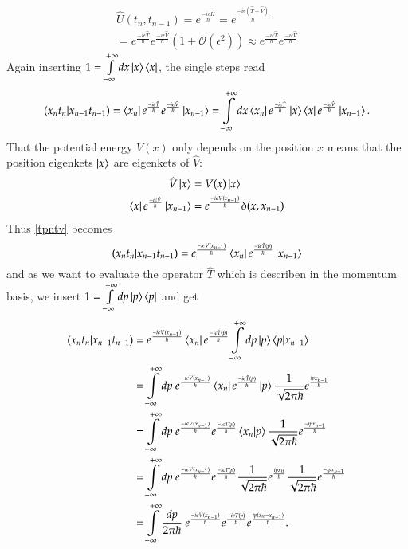 \begin{align}\label{UTV}
  \hat{U}(t_{n},t_{n-1}) = e^{\frac{-i \epsilon \hat{H}}{\hbar}} = e^{\frac{-i \epsilon (\hat T + \hat V)}{\hbar}} \\
  = e^{\frac{-i \epsilon \hat{T}}{\hbar}} e^{\frac{-i \epsilon \hat{V}}{\hbar}} (1 + \mathcal{O} (\epsilon^2) ) \approx e^{\frac{-i \epsilon \hat{T}}{\hbar}} e^{\frac{-i \epsilon \hat{V}}{\hbar}} 
\end{align}
Again inserting $1 = \int\limits_{-\infty}^{+\infty} dx \ket{x}\bra{x}$, the single steps read
\begin{equation}\label{tpntv}
  (x_n t_n | x_{n-1} t_{n-1}) = \bra{x_n} e^{\frac{-i \epsilon \hat{T}}{\hbar}} e^{\frac{-i \epsilon \hat{V}}{\hbar}}  \ket{x_{n-1}} = \int\limits_{-\infty}^{+\infty} dx \bra{x_n} e^{\frac{-i \epsilon \hat{T}}{\hbar}} \ket{x} \bra{x} e^{\frac{-i \epsilon \hat{V}}{\hbar}}  \ket{x_{n-1}}.
\end{equation}
That the potential energy $V(x)$ only depends on the position $x$ means that the position eigenkets $\ket{x}$ are eigenkets of $\hat{V}$:
\begin{align}\label{Vx}
  \hat{V} \ket{x} &= V(x) \ket{x}  \\
  \bra{x} e^{\frac{-i \epsilon \hat{V}}{\hbar}}  \ket{x_{n-1}} &= e^{\frac{-i \epsilon V(x_{n-1})}{\hbar}} \delta (x,x_{n-1})
\end{align}
Thus \ref{tpntv} becomes
\begin{equation}\label{tpni}
   (x_n t_n | x_{n-1} t_{n-1}) = e^{\frac{-i \epsilon V(x_{n-1})}{\hbar}} \bra{x_n} e^{\frac{-i \epsilon \hat{T}(\hat{p})}{\hbar}} \ket{x_{n-1}}
\end{equation}
and as we want to evaluate the operator $\hat{T}$ which is describen in the momentum basis, we insert $1 = \int\limits_{-\infty}^{+\infty} dp \ket{p}\bra{p}$ and get
\begin{align}\label{tpnp}
   (x_n t_n | x_{n-1} t_{n-1})  &= e^{\frac{-i \epsilon V(x_{n-1})}{\hbar}} \bra{x_n} e^{\frac{-i \epsilon \hat{T}(\hat{p})}{\hbar}} \int\limits_{-\infty}^{+\infty} dp \ket{p}\braket{p|x_{n-1}} \\
                                &= \int\limits_{-\infty}^{+\infty} dp \ e^{\frac{-i \epsilon V(x_{n-1})}{\hbar}} \bra{x_n} e^{\frac{-i \epsilon \hat{T}(\hat{p})}{\hbar}} \ket{p} \frac{1}{\sqrt{2 \pi \hbar}} e^{\frac{i p x_{n-1}}{\hbar}} \\
                                &= \int\limits_{-\infty}^{+\infty} dp \ e^{\frac{-i \epsilon V(x_{n-1})}{\hbar}} e^{\frac{-i \epsilon T(p)}{\hbar}} \braket{x_n|p} \frac{1}{\sqrt{2 \pi \hbar}} e^{\frac{- i p x_{n-1}}{\hbar}} \\
                                &= \int\limits_{-\infty}^{+\infty} dp \ e^{\frac{-i \epsilon V(x_{n-1})}{\hbar}} e^{\frac{-i \epsilon T(p)}{\hbar}} \frac{1}{\sqrt{2 \pi \hbar}} e^{\frac{i p x_{n}}{\hbar}} \frac{1}{\sqrt{2 \pi \hbar}} e^{\frac{- i p x_{n-1}}{\hbar}}  \\
                                &= \int\limits_{-\infty}^{+\infty} \frac{dp}{2 \pi \hbar}  \ e^{\frac{-i \epsilon V(x_{n-1})}{\hbar}} e^{\frac{-i \epsilon T(p)}{\hbar}} e^{\frac{i p (x_{n} -x_{n-1})}{\hbar}}.
\end{align}
